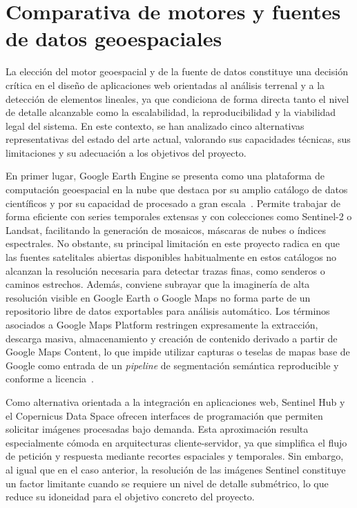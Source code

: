 \section{Comparativa de motores y fuentes de datos geoespaciales}

La elección del motor geoespacial y de la fuente de datos constituye una decisión crítica en el diseño de aplicaciones web orientadas al análisis terrenal y a la detección de elementos lineales, ya que condiciona de forma directa tanto el nivel de detalle alcanzable como la escalabilidad, la reproducibilidad y la viabilidad legal del sistema. En este contexto, se han analizado cinco alternativas representativas del estado del arte actual, valorando sus capacidades técnicas, sus limitaciones y su adecuación a los objetivos del proyecto.

En primer lugar, Google Earth Engine se presenta como una plataforma de computación geoespacial en la nube que destaca por su amplio catálogo de datos científicos y por su capacidad de procesado a gran escala~\cite{googleearthengine_web, gorelick2017google, googleearthengine_terms}. Permite trabajar de forma eficiente con series temporales extensas y con colecciones como Sentinel-2 o Landsat, facilitando la generación de mosaicos, máscaras de nubes o índices espectrales. No obstante, su principal limitación en este proyecto radica en que las fuentes satelitales abiertas disponibles habitualmente en estos catálogos no alcanzan la resolución necesaria para detectar trazas finas, como senderos o caminos estrechos. Además, conviene subrayar que la imaginería de alta resolución visible en Google Earth o Google Maps no forma parte de un repositorio libre de datos exportables para análisis automático. Los términos asociados a Google Maps Platform restringen expresamente la extracción, descarga masiva, almacenamiento y creación de contenido derivado a partir de Google Maps Content, lo que impide utilizar capturas o teselas de mapas base de Google como entrada de un \textit{pipeline} de segmentación semántica reproducible y conforme a licencia~\cite{googlemaps_platform_terms}.

Como alternativa orientada a la integración en aplicaciones web, Sentinel Hub y el Copernicus Data Space ofrecen interfaces de programación que permiten solicitar imágenes procesadas bajo demanda. Esta aproximación resulta especialmente cómoda en arquitecturas cliente-servidor, ya que simplifica el flujo de petición y respuesta mediante recortes espaciales y temporales. Sin embargo, al igual que en el caso anterior, la resolución de las imágenes Sentinel constituye un factor limitante cuando se requiere un nivel de detalle submétrico, lo que reduce su idoneidad para el objetivo concreto del proyecto.

